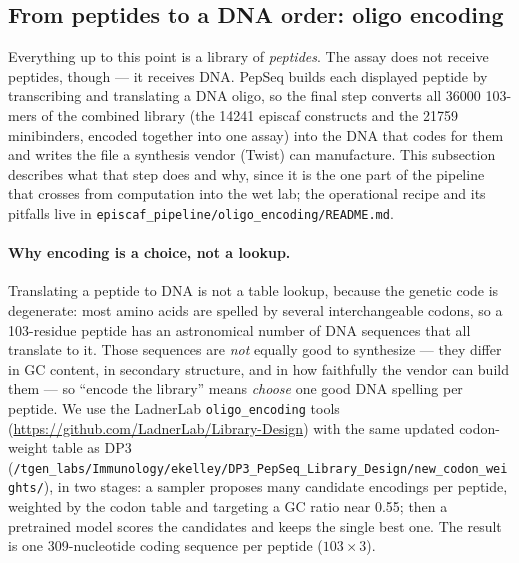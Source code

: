 \subsection{From peptides to a DNA order: oligo encoding}\label{sec:oligo}

Everything up to this point is a library of \emph{peptides}. The assay does not receive peptides,
though --- it receives DNA. PepSeq builds each displayed peptide by transcribing and translating a DNA
oligo, so the final step converts all \num{36000} 103-mers of the combined library (the \num{14241}
episcaf constructs and the \num{21759} minibinders, encoded together into one assay) into the DNA that
codes for them and writes
the file a synthesis vendor (Twist) can manufacture. This subsection describes what that step does and
why, since it is the one part of the pipeline that crosses from computation into the wet lab; the
operational recipe and its pitfalls live in \texttt{episcaf\_pipeline/oligo\_encoding/README.md}.

\paragraph{Why encoding is a choice, not a lookup.} Translating a peptide to DNA is not a table
lookup, because the genetic code is degenerate: most amino acids are spelled by several
interchangeable codons, so a 103-residue peptide has an astronomical number of DNA sequences that all
translate to it. Those sequences are \emph{not} equally good to synthesize --- they differ in GC
content, in secondary structure, and in how faithfully the vendor can build them --- so ``encode the
library'' means \emph{choose} one good DNA spelling per peptide. We use the LadnerLab
\texttt{oligo\_encoding} tools (\url{https://github.com/LadnerLab/Library-Design}) with the same
updated codon-weight table as DP3
(\texttt{/tgen\_labs/Immunology/ekelley/DP3\_PepSeq\_Library\_Design/new\_codon\_weights/}), in two
stages: a sampler proposes many candidate encodings per peptide, weighted by the codon table and
targeting a GC ratio near \num{0.55}; then a pretrained model scores the candidates and keeps the
single best one. The result is one 309-nucleotide coding sequence per peptide ($103 \times 3$).

